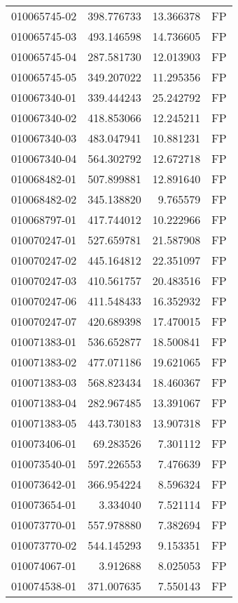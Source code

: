 \begin{tabular}{lrrl}
010065745-02 &  398.776733 &    13.366378 &   FP \\
010065745-03 &  493.146598 &    14.736605 &   FP \\
010065745-04 &  287.581730 &    12.013903 &   FP \\
010065745-05 &  349.207022 &    11.295356 &   FP \\
010067340-01 &  339.444243 &    25.242792 &   FP \\
010067340-02 &  418.853066 &    12.245211 &   FP \\
010067340-03 &  483.047941 &    10.881231 &   FP \\
010067340-04 &  564.302792 &    12.672718 &   FP \\
010068482-01 &  507.899881 &    12.891640 &   FP \\
010068482-02 &  345.138820 &     9.765579 &   FP \\
010068797-01 &  417.744012 &    10.222966 &   FP \\
010070247-01 &  527.659781 &    21.587908 &   FP \\
010070247-02 &  445.164812 &    22.351097 &   FP \\
010070247-03 &  410.561757 &    20.483516 &   FP \\
010070247-06 &  411.548433 &    16.352932 &   FP \\
010070247-07 &  420.689398 &    17.470015 &   FP \\
010071383-01 &  536.652877 &    18.500841 &   FP \\
010071383-02 &  477.071186 &    19.621065 &   FP \\
010071383-03 &  568.823434 &    18.460367 &   FP \\
010071383-04 &  282.967485 &    13.391067 &   FP \\
010071383-05 &  443.730183 &    13.907318 &   FP \\
010073406-01 &   69.283526 &     7.301112 &   FP \\
010073540-01 &  597.226553 &     7.476639 &   FP \\
010073642-01 &  366.954224 &     8.596324 &   FP \\
010073654-01 &    3.334040 &     7.521114 &   FP \\
010073770-01 &  557.978880 &     7.382694 &   FP \\
010073770-02 &  544.145293 &     9.153351 &   FP \\
010074067-01 &    3.912688 &     8.025053 &   FP \\
010074538-01 &  371.007635 &     7.550143 &   FP \\

\end{tabular}
